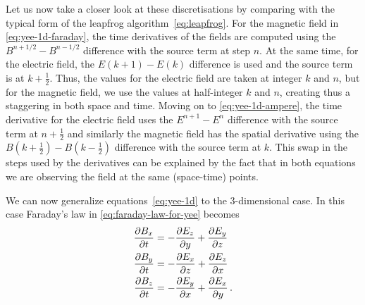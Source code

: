 \documentclass[12pt, class=report, crop=false]{standalone}
\begin{document}
Let us now take a closer look at these discretisations by comparing with the typical form of the leapfrog
algorithm~\eqref{eq:leapfrog}.
For the magnetic field in \cref{eq:yee-1d-faraday}, the time derivatives of the fields are
computed using the \(B^{n+1/2} - B^{n-1/2}\) difference with the source term at step \(n\).
At the same time, for the electric field, the \(E(k+1)-E(k)\) difference is used and the source
term is at \(k+\frac{1}{2}\). Thus, the values for the electric
field are taken at integer \(k\) and \(n\), but for the magnetic
field, we use the values at half-integer \(k\) and \(n\), creating
thus a staggering in both space and time. Moving on to  \cref{eq:yee-1d-ampere},
the time derivative for the electric field uses the \(E^{n+1}-E^n\)
difference with the source term at \(n+\frac{1}{2}\) and similarly
the magnetic field has the spatial derivative using the \(B(k+\frac{1}{2}) - B(k-\frac{1}{2})\) difference with the source
term at \(k\). This swap in the steps used by the derivatives can
be explained by the fact that in both equations we are observing
the field at the same (space-time) points.

We can now generalize equations~\eqref{eq:yee-1d} to the 3-dimensional case.
In this case Faraday's law in \cref{eq:faraday-law-for-yee} becomes
\begin{align*}
  \pdv{B_x}{t} &= -\pdv{E_z}{y} + \pdv{E_y}{z} \\
  \pdv{B_y}{t} &= -\pdv{E_x}{z} + \pdv{E_z}{x} \\
  \pdv{B_z}{t} &= -\pdv{E_y}{x} + \pdv{E_x}{y} \,.
\end{align*}
\end{document}
